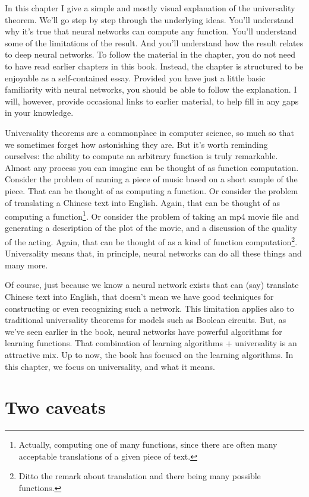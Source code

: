 In this chapter I give a simple and mostly visual explanation of the universality theorem. We'll go step by step through the underlying ideas. You'll understand why it's true that neural networks can compute any function. You'll understand some of the limitations of the result. And you'll understand how the result relates to deep neural networks.
To follow the material in the chapter, you do not need to have read earlier chapters in this book. Instead, the chapter is structured to be enjoyable as a self-contained essay. Provided you have just a little basic familiarity with neural networks, you should be able to follow the explanation. I will, however, provide occasional links to earlier material, to help fill in any gaps in your knowledge.

Universality theorems are a commonplace in computer science, so much so that we sometimes forget how astonishing they are. But it's worth reminding ourselves: the ability to compute an arbitrary function is truly remarkable. Almost any process you can imagine can be thought of as function computation. Consider the problem of naming a piece of music based on a short sample of the piece. That can be thought of as computing a function. Or consider the problem of translating a Chinese text into English. Again, that can be thought of as computing a function\footnote{Actually, computing one of many functions, since there are often many acceptable translations of a given piece of text.}. Or consider the problem of taking an mp4 movie file and generating a description of the plot of the movie, and a discussion of the quality of the acting. Again, that can be thought of as a kind of function computation\footnote{Ditto the remark about translation and there being many possible functions.}. Universality means that, in principle, neural networks can do all these things and many more.


Of course, just because we know a neural network exists that can (say) translate Chinese text into English, that doesn't mean we have good techniques for constructing or even recognizing such a network. This limitation applies also to traditional universality theorems for models such as Boolean circuits. But, as we've seen earlier in the book, neural networks have powerful algorithms for learning functions. That combination of learning algorithms + universality is an attractive mix. Up to now, the book has focused on the learning algorithms. In this chapter, we focus on universality, and what it means.

\section{Two caveats}

